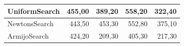 \documentclass[a4paper,english,titlepage,12pt]{article}
\begin{document}
\begin{table}[]
\begin{tabular}{|l|r|r|r|r|}
    UniformSearch                                                             & \cellcolor[HTML]{FCEDEC}455,00                           & 389,20                                                    & 558,20                                                    & \cellcolor[HTML]{F0F9F5}322,40                            \\ \hline
    NewtonsSearch                                                             & \cellcolor[HTML]{F0F9F5}443,50                           & 453,30                                                    & 552,80                                                    & 375,10                                                    \\ \hline
    ArmijoSearch                                                              & \cellcolor[HTML]{7BC9A3}424,20                           & \cellcolor[HTML]{7BC9A3}209,30                            & \cellcolor[HTML]{7BC9A3}405,30                            & \cellcolor[HTML]{7BC9A3}217,30                            \\ \hline
    \end{tabular}
\end{table}
\end{document}
